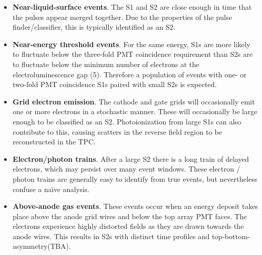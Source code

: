 \begin{itemize}
    \item \textbf{Near-liquid-surface events}. 
    The S1 and S2 are close enough in time that the pulses appear merged together.
    Due to the properties of the pulse finder/classifier, this is typically identified as an S2.
    \item \textbf{Near-energy threshold events}.
    For the same energy, S1s are more likely to fluctuate below the three-fold PMT coincidence requirement than S2s are to fluctuate below the minimum number of electrons at the electroluminescence gap (5).
    Therefore a population of events with one- or two-fold PMT coincidence S1s  paired with small S2s is expected.
    \item \textbf{Grid electron emission}.
    The cathode and gate grids will occasionally emit one or more electrons in a stochastic manner\cite{tomas_study_2018}.
    These will occasionally be large enough to be classified as an S2.
    Photoionization from large S1s can also contribute to this, causing scatters in the reverse field region to be reconstructed in the TPC.
    \item \textbf{Electron/photon trains}. 
    After a large S2 there is a long train of delayed electrons, which may persist over many event windows\cite{akerib_investigation_2020}.
    These electron / photon trains are generally easy to identify from true events, but nevertheless confuse a na\"ive analysis.
    \item \textbf{Above-anode gas events}.
    These events occur when an energy deposit takes place above the anode grid wires and below the top array PMT faces.
    The electrons experience highly distorted fields as they are drawn towards the anode wires. 
    This results in S2s with distinct time profiles and top-bottom-asymmetry(TBA).
\end{itemize}

